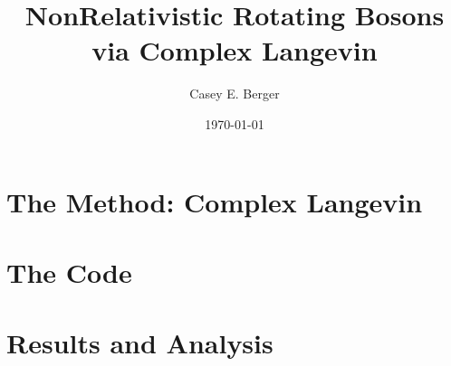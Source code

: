 \documentclass[onecolumn, 12pt]{report}
\title{NonRelativistic Rotating Bosons via Complex Langevin}
\author{Casey E. Berger}
\date{\today}
\begin{document}
\begin{titlepage}
\maketitle
\end{titlepage}
\tableofcontents

%

%


\chapter{The Method: Complex Langevin}


\chapter{The Code}


\chapter{Results and Analysis}


%

\end{document}
